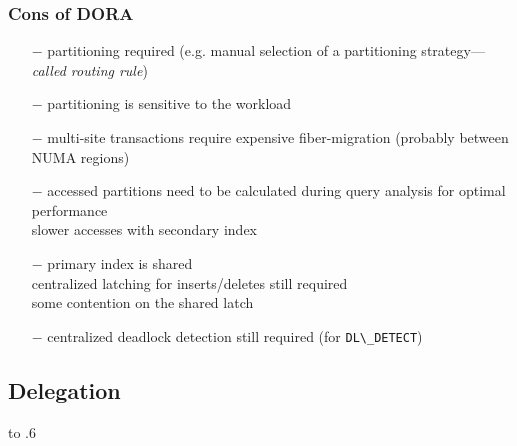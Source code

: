 \begin{frame}
	\frametitle{Cons of DORA}
	
	\begin{itemize}
		\item[$-$]	partitioning required (e.g. manual selection of a partitioning strategy---\textit{called routing rule})
		\item[$-$]	partitioning is sensitive to the workload
		\item[$-$]	multi-site transactions require expensive fiber-migration (probably between NUMA regions)
		\item[$-$]	accessed partitions need to be calculated during query analysis for optimal performance \\ \bm{$\rightarrow$} slower accesses with secondary index
		\item[$-$]	primary index is shared \\ \bm{$\rightarrow$} centralized latching for inserts/\-deletes still required \\ \bm{$\rightarrow$} some contention on the shared latch
		\item[$-$]	centralized deadlock detection still required (for \lstinline{DL\_DETECT})
	\end{itemize}
\end{frame}

\subsection[Delegation]{Delegation}

\begin{frame}
	\vbox to .6
\end{frame}

